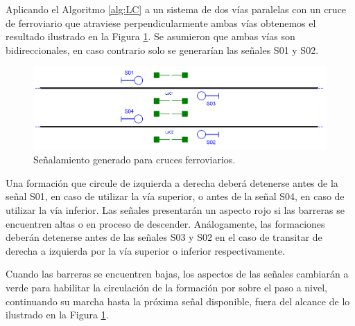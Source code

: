     Aplicando el Algoritmo \ref{alg:LC} a un sistema de dos vías paralelas con un cruce de ferroviario que atraviese perpendicularmente ambas vías obtenemos el resultado ilustrado en la Figura \ref{fig:signal_crossing}. Se asumieron que ambas vías son bidireccionales, en caso contrario solo se generarían las señales S01 y S02.
    
    \begin{figure}[h!]
        \centering
        \includegraphics[width=1\textwidth]{Figuras/crossings.PNG}
        \centering\caption{Señalamiento generado para cruces ferroviarios.}
        \label{fig:signal_crossing}
    \end{figure}
    
    Una formación que circule de izquierda a derecha deberá detenerse antes de la señal S01, en caso de utilizar la vía superior, o antes de la señal S04, en caso de utilizar la vía inferior. Las señales presentarán un aspecto rojo si las barreras se encuentren altas o en proceso de descender. Análogamente, las formaciones deberán detenerse antes de las señales S03 y S02 en el caso de transitar de derecha a izquierda por la vía superior o inferior respectivamente. 

    Cuando las barreras se encuentren bajas, los aspectos de las señales cambiarán a verde para habilitar la circulación de la formación por sobre el paso a nivel, continuando su marcha hasta la próxima señal disponible, fuera del alcance de lo ilustrado en la Figura \ref{fig:signal_crossing}.    